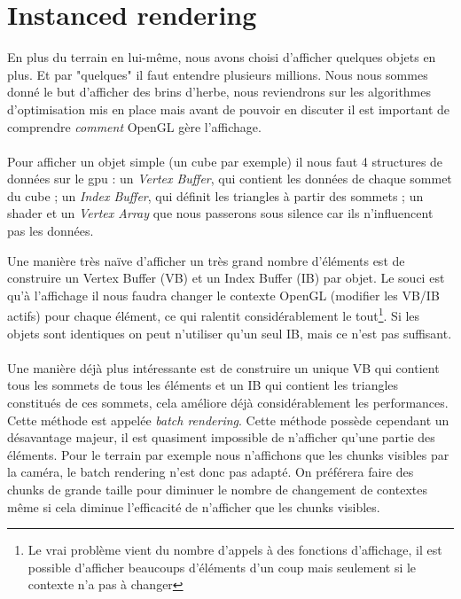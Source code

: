\documentclass{EPUProjetDi}
\begin{document}
\section{Instanced rendering}
\label{sec:instanced_rendering}

En plus du terrain en lui-même, nous avons choisi d'afficher quelques objets en plus. Et par "quelques" il faut entendre plusieurs millions. Nous nous sommes donné le but d'afficher des brins d'herbe, nous reviendrons sur les algorithmes d'optimisation mis en place mais avant de pouvoir en discuter il est important de comprendre \textit{comment} OpenGL gère l'affichage.
\paragraph{}
Pour afficher un objet simple (un cube par exemple) il nous faut 4 structures de données sur le gpu : un \textit{Vertex Buffer}, qui contient les données de chaque sommet du cube ; un \textit{Index Buffer}, qui définit les triangles à partir des sommets ; un shader et un \textit{Vertex Array} que nous passerons sous silence car ils n'influencent pas les données.

Une manière très naïve d'afficher un très grand nombre d'éléments est de construire un Vertex Buffer (VB) et un Index Buffer (IB) par objet. Le souci est qu'à l'affichage il nous faudra changer le contexte OpenGL (modifier les VB/IB actifs) pour chaque élément, ce qui ralentit considérablement le tout\footnote{Le vrai problème vient du nombre d'appels à des fonctions d'affichage, il est possible d'afficher beaucoups d'éléments d'un coup mais seulement si le contexte n'a pas à changer}.
Si les objets sont identiques on peut n'utiliser qu'un seul IB, mais ce n'est pas suffisant.

\paragraph{}
Une manière déjà plus intéressante est de construire un unique VB qui contient tous les sommets de tous les éléments et un IB qui contient les triangles constitués de ces sommets, cela améliore déjà considérablement les performances. Cette méthode est appelée \textit{batch rendering}.
Cette méthode possède cependant un désavantage majeur, il est quasiment impossible de n'afficher qu'une partie des éléments. Pour le terrain par exemple nous n'affichons que les chunks visibles par la caméra, le batch rendering n'est donc pas adapté. On préférera faire des chunks de grande taille pour diminuer le nombre de changement de contextes même si cela diminue l'efficacité de n'afficher que les chunks visibles.
\end{document}
